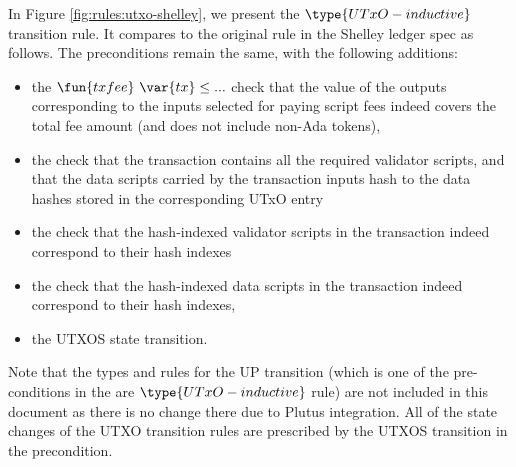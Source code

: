 In Figure \ref{fig:rules:utxo-shelley}, we present the $\type{UTxO-inductive}$
transition rule. It compares to the original rule in the Shelley ledger spec
as follows. The preconditions remain the same, with the following additions:

\begin{itemize}
  \item the $\fun{txfee}~\var{tx} \leq ...$ check
  that the value of the outputs corresponding to the inputs selected
  for paying script fees indeed covers the total fee amount (and does not
  include non-Ada tokens),

  \item the check that the transaction contains all the required validator
  scripts, and that the data scripts carried by the transaction inputs hash to the
  data hashes stored in the corresponding UTxO entry

  \item the check that the hash-indexed validator scripts in the transaction
  indeed correspond to their hash indexes

  \item the check that the hash-indexed data scripts in the
  transaction indeed correspond to their hash indexes,

  \item the UTXOS state transition.
\end{itemize}

Note that the types and rules for the UP transition (which is one of the
pre-conditions in the are $\type{UTxO-inductive}$ rule) are not included
in this document as there is no change there due to Plutus integration.
All of the state changes of the UTXO transition rules are prescribed by
the UTXOS transition in the precondition.


